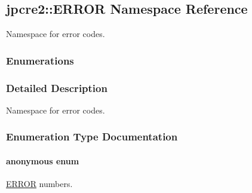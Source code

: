 \hypertarget{namespacejpcre2_1_1ERROR}{}\subsection{jpcre2\+:\+:E\+R\+R\+OR Namespace Reference}
\label{namespacejpcre2_1_1ERROR}


Namespace for error codes.  


\subsubsection*{Enumerations}


\subsubsection{Detailed Description}
Namespace for error codes. 



\subsubsection{Enumeration Type Documentation}
\paragraph[{\texorpdfstring{anonymous enum}{anonymous enum}}]{\setlength{\rightskip}{0pt plus 5cm}anonymous enum}\hypertarget{namespacejpcre2_1_1ERROR_a4b2998984439438fa9da8d7043909bc2}{}\label{namespacejpcre2_1_1ERROR_a4b2998984439438fa9da8d7043909bc2}


\hyperlink{namespacejpcre2_1_1ERROR}{E\+R\+R\+OR} numbers. 


